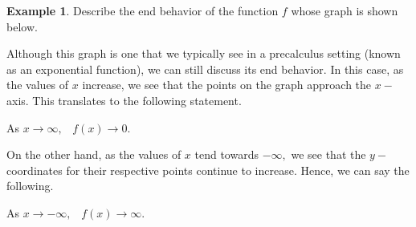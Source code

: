 \documentclass[12pt]{book}
\theoremstyle{definition}
\newtheorem{example}{Example}
\begin{document}
\begin{example}
Describe the end behavior of the function $f$ whose graph is shown below.
\begin{multicols}{2}
\begin{center}
\end{center}

\columnbreak

Although this graph is one that we typically see in a precalculus setting (known as an exponential function), we can still discuss its end behavior.  In this case, as the values of $x$ increase, we see that the points on the graph approach the $x-$axis.  This translates to the following statement.
\begin{center}
As $x\rightarrow\infty,$ \ $f(x)\rightarrow 0$.
\end{center}
\end{multicols}
On the other hand, as the values of $x$ tend towards $-\infty,$ we see that the $y-$coordinates for their respective points continue to increase.  Hence, we can say the following.
\begin{center}
As $x\rightarrow -\infty,$ \ $f(x)\rightarrow \infty$.
\end{center}
\end{example}
\end{document}
